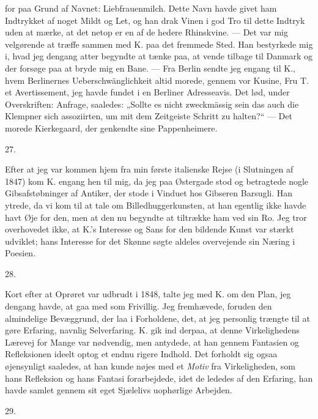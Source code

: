 \documentclass[12pt,a4paper,openany]{book}
\newcommand{\secnum}[1]{\par\begin{center}#1\end{center}\par\nobreak}
\newcommand{\opage}[1]{\marginnote{\footnotesize\textit{[#1]}}}
\begin{document}
for paa Grund af Navnet: Liebfrauenmilch. Dette Navn havde givet
ham Indtrykket af noget Mildt og Let, og han drak Vinen i god Tro
til dette Indtryk uden at mærke, at det netop er en af de hedere
Rhinskvine. --- Det var mig velgørende at træffe sammen med K. paa
det fremmede Sted. Han bestyrkede mig i, hvad jeg dengang atter
begyndte at tænke paa, at vende tilbage til Danmark og der forsøge
paa at bryde mig en Bane. --- Fra Berlin sendte jeg engang til K.,
hvem Berlinernes Ueberschwänglichkeit altid morede, gennem vor
Kusine, Fru T. et Avertissement, jeg havde fundet i en Berliner
Adresseavis. Det lød, under Overskriften: Anfrage, saaledes:
„Sollte es nicht zweckmässig sein das auch die Klempner sich
assoziirten, um mit dem Zeitgeiste Schritt zu halten?“ --- Det
morede Kierkegaard, der genkendte sine Pappenheimere.

\secnum{27.}

\opage{357}Efter at jeg var kommen hjem fra min første italienske
Rejse (i Slutningen af 1847) kom K. engang hen til mig,
da jeg paa Østergade stod og betragtede nogle Gibsafstøbninger
af Antiker, der stode i Vinduet hos Gibseren
Barsugli. Han ytrede, da vi kom til at tale om Billedhuggerkunsten,
at han egentlig ikke havde havt Øje for
den, men at den nu begyndte at tiltrække ham ved
sin Ro. Jeg tror overhovedet ikke, at K.’s Interesse og
Sans for den bildende Kunst var stærkt udviklet; hans
Interesse for det Skønne søgte aldeles overvejende sin
Næring i Poesien.

\secnum{28.}

Kort efter at Oprøret var udbrudt i 1848, talte jeg
med K. om den Plan, jeg dengang havde, at gaa med
som Frivillig. Jeg fremhævede, foruden den almindelige
Bevæggrund, der laa i Forholdene, det, at jeg personlig
trængte til at gøre Erfaring, navnlig Selverfaring. K.
gik ind derpaa, at denne Virkelighedens Lærevej for
Mange var nødvendig, men antydede, at han gennem
Fantasien og Refleksionen ideelt optog et endnu rigere
Indhold. Det forholdt sig ogsaa øjensynligt saaledes, at
han kunde nøjes med et \emph{Motiv} fra Virkeligheden, som
hans Refleksion og hans Fantasi forarbejdede, idet de
lededes af den Erfaring, han havde samlet gennem sit
eget Sjælelivs uophørlige Arbejden.

\secnum{29.}
\end{document}
